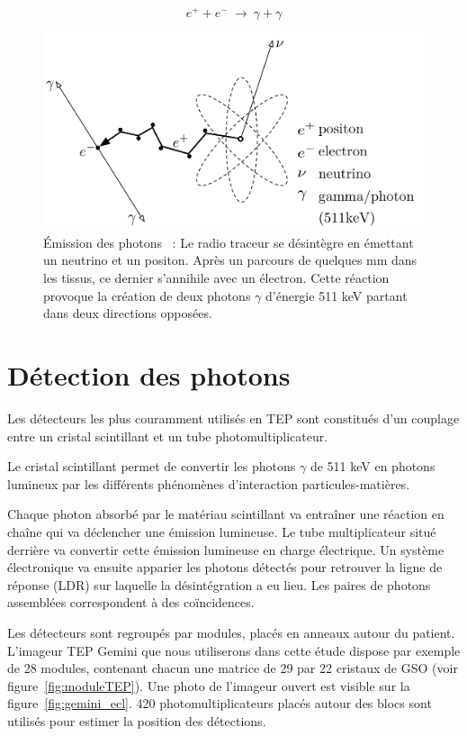 \begin{equation}
 e^+ + e^-~\rightarrow~\gamma + \gamma
\label{eq:annihilation}
\end{equation}

\begin{figure}
\centering
\includegraphics[width=12cm]{images/annihilation}
\caption[\'Emission des photons]{\'Emission des photons~\cite{Langner2008ad} : Le radio traceur se désintègre en émettant un neutrino et un positon. Après un parcours de quelques mm dans les tissus, ce dernier s'annihile avec un électron. Cette réaction provoque la création de deux photons $\gamma$ d'énergie 511 keV partant dans deux directions opposées.}
\label{fig:Langner2008ad}
\end{figure}

\section{Détection des photons}

Les détecteurs les plus couramment utilisés en TEP sont constitués d'un couplage entre un cristal scintillant et un tube photomultiplicateur.

Le cristal scintillant permet de convertir les photons $\gamma$ de 511 keV en photons lumineux par les différents phénomènes d'interaction particules-matières.

Chaque photon absorbé par le matériau scintillant va entraîner une réaction en chaîne qui va déclencher une émission lumineuse. Le tube multiplicateur situé derrière va convertir cette émission lumineuse en charge électrique. Un système électronique va ensuite apparier les photons détectés pour retrouver la ligne de réponse (LDR) sur laquelle la désintégration a eu lieu. Les paires de photons assemblées correspondent à des coïncidences.

Les détecteurs sont regroupés par modules, placés en anneaux autour du patient. L'imageur TEP Gemini que nous utiliserons dans cette étude dispose par exemple de 28 modules, contenant chacun une matrice de 29 par 22 cristaux de GSO (voir figure~\ref{fig:moduleTEP}). Une photo de l'imageur ouvert est visible sur la figure~\ref{fig:gemini_ecl}. 420 photomultiplicateurs placés autour des blocs sont utilisés pour estimer la position des détections.

